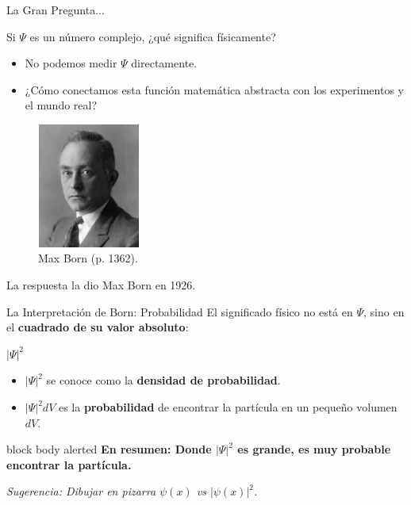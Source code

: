 \documentclass[12pt,aspectratio=169]{beamer}
\begin{document}
		\begin{frame}{La Gran Pregunta...}
		\begin{alertblock}{Si $\Psi$ es un número complejo, ¿qué significa físicamente?}
			\begin{itemize}
				\item No podemos medir $\Psi$ directamente.
				\item ¿Cómo conectamos esta función matemática abstracta con los experimentos y el mundo real?
			\end{itemize}
		\end{alertblock}
		\begin{figure}
			\centering
			\includegraphics[width=0.3\textwidth]{../Imagenes/MaxBorn} %
			\caption{Max Born (p. 1362).}
		\end{figure}
		\centering La respuesta la dio Max Born en 1926.
	\end{frame}
	\begin{frame}{La Interpretación de Born: Probabilidad}
	El significado físico no está en $\Psi$, sino en el \textbf{cuadrado de su valor absoluto}:
	\begin{center}
		\Huge $|\Psi|^2$
	\end{center}
	\begin{itemize}
		\item $|\Psi|^2$ se conoce como la \textbf{densidad de probabilidad}.
		\item $|\Psi|^2 dV$ es la \textbf{probabilidad} de encontrar la partícula en un pequeño volumen $dV$.
	\end{itemize}
	\vspace{1em}
	\begin{beamercolorbox}[sep=0.3cm,center,wd=\textwidth]{block body alerted}
		\textbf{En resumen: Donde $|\Psi|^2$ es grande, es muy probable encontrar la partícula.}
	\end{beamercolorbox}
	\tiny{\textit{Sugerencia: Dibujar en pizarra $\psi(x)$ vs $|\psi(x)|^2$.}}
\end{frame}	
\end{document}
